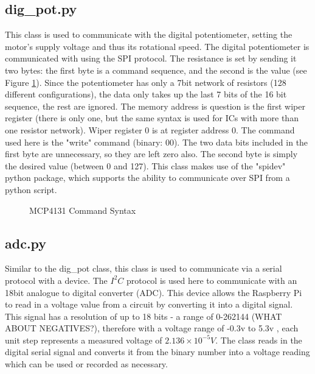 \documentclass[a4]{report}
\begin{document}
	\subsection{dig\_pot.py}
	This class is used to communicate with the digital potentiometer, setting the motor's supply voltage and thus its rotational speed. The digital potentiometer is communicated with using the SPI protocol. The resistance is set by sending it two bytes: the first byte is a command sequence, and the second is the value (see Figure \ref{mcp4131commfig}). Since the potentiometer has only a 7bit network of resistors (128 different configurations), the data only takes up the last 7 bits of the 16 bit sequence, the rest are ignored. The memory address is question is the first wiper register (there is only one, but the same syntax is used for ICs with more than one resistor network). Wiper register 0 is at register address 0. The command used here is the "write" command (binary: 00). The two data bits included in the first byte are unnecessary, so they are left zero also. The second byte is simply the desired value (between 0 and 127). \newline \newline \noindent
	This class makes use of the "spidev" python package, which supports the ability to communicate over SPI from a python script.
	\begin{figure}[!htb]
		\centering
		\caption{MCP4131 Command Syntax \cite[p.~47]{mcp4131datasheet}}
		\label{mcp4131commfig}
	\end{figure} \newline  \noindent
	
	\subsection{adc.py}
	Similar to the dig\_pot class, this class is used to communicate via a serial protocol with a device. The \(I^2C\) protocol is used here to communicate with an 18bit analogue to digital converter (ADC). This device allows the Raspberry Pi to read in a voltage value from a circuit by converting it into a digital signal. This signal has a resolution of up to 18 bits - a range of 0-262144 (WHAT ABOUT NEGATIVES?), therefore with a voltage range of -0.3v to 5.3v \cite{mcp3424datasheet}, each unit step represents a measured voltage of \(2.136\times10^{-5}V\). The class reads in the digital serial signal and converts it from the binary number into a voltage reading which can be used or recorded as necessary.
\end{document}
